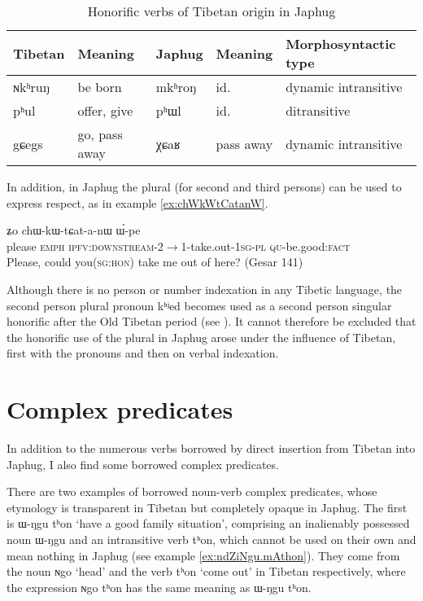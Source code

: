 \documentclass[oldfontcommands,oneside,a4paper,11pt]{article}
\newcommand{\ipa}[1]{{\phon \mbox{#1}}} %
\begin{document}
\begin{table}
\caption{Honorific verbs of Tibetan origin in Japhug} \centering \label{tab:hon}
\begin{tabular}{lllll}
\toprule
Tibetan & Meaning & Japhug &Meaning &Morphosyntactic type \\
\midrule
\ipa{ɴkʰruŋ} & be born & \ipa{mkʰroŋ} &id. &dynamic intransitive \\
\ipa{pʰul} & offer, give  & \ipa{pʰɯl} &id. &ditransitive \\
\ipa{gɕegs} & go, pass away & \ipa{χɕaʁ} &pass away &dynamic intransitive \\
\bottomrule
\end{tabular}
\end{table}

In addition, in Japhug the plural (for second and third persons) can be used to express respect, as in example \ref{ex:chWkWtCatanW}. 

\begin{exe}
\ex \label{ex:chWkWtCatanW}
\gll \ipa{wortɕhiwojɤr}  	\ipa{ʑo}  	\ipa{chɯ-kɯ-tɕat-a-nɯ}  	\ipa{ɯ́-pe}  \\
please \textsc{emph} \textsc{ipfv:downstream}-2$\rightarrow$1-take.out-\textsc{1sg-pl} \textsc{qu}-be.good:\textsc{fact} \\
\glt Please, could you(\textsc{sg:hon}) take me out of here? (Gesar 141)
\end{exe}

Although there is no person or number indexation in any Tibetic language, the second person plural pronoun \ipa{kʰʲed} becomes used as a second person singular honorific after the Old Tibetan period (see \citealt[563-4]{hill10pronouns}). It cannot therefore be excluded that the honorific use of the plural in Japhug arose under the influence of Tibetan, first with the pronouns and then on verbal indexation.

  \section{Complex predicates}  
In addition to the numerous verbs borrowed by direct insertion from Tibetan into Japhug, I also find some borrowed complex predicates.

There are two examples of borrowed noun-verb complex predicates, whose etymology is transparent in Tibetan but completely opaque in Japhug. The first is \ipa{ɯ-ŋgu} \ipa{tʰon} `have a good family situation', comprising an inalienably possessed noun \ipa{ɯ-ŋgu} and an intransitive verb \ipa{tʰon}, which cannot be used on their own and mean nothing in Japhug (see example \ref{ex:ndZiNgu.mAthon}). They come from the noun \ipa{ɴgo} `head' and the verb \ipa{tʰon} `come out' in Tibetan respectively, where the expression \ipa{ɴgo} \ipa{tʰon} has the same meaning as \ipa{ɯ-ŋgu} \ipa{tʰon}.
\end{document}
